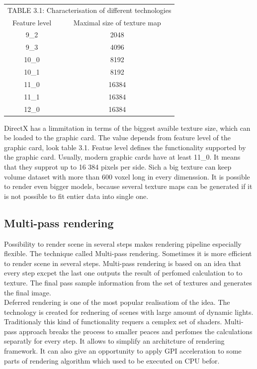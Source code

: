 \documentclass[twoside, english, 11pt]{report}
\begin{document}
\begin{table}[!h]
 \begin{center}
    \begin{tabular}{ c  c }
    \multicolumn{2}{l}{TABLE 3.1: Characterisation of different technologies \label{tab:level}}\\
    Feature level & Maximal size of texture map\\
    \hline
    9\_2 & 2048\\
    9\_3 & 4096\\
    10\_0 & 8192\\
    10\_1 & 8192\\
    11\_0 & 16384\\
    11\_1 & 16384\\
    12\_0 & 16384\\
    \end{tabular}

  \end{center}
\end{table}
DirectX has a limmitation in terms of the biggest avaible texture size, which can be loaded to the graphic card. The value depends from feature level of the graphic card, look table 3.1. Featue level defines the functionality supported by the graphic card. Usually, modern graphic cards have at least 11\_0. It means that they supprot up to 16 384 pixels per side. Sich a big texture can keep volume dataset with more than 600 voxel long in every dimenssion. It is possible to render even bigger models, because several texture maps can be generated if it is not possible to fit entier data into single one.\\

\subsection{Multi-pass rendering}

Possibility to render scene in several steps makes rendering pipeline especially flexible. The technique called Multi-pass rendering. Sometimes it is more efficient to render scene in several steps. Multi-pass rendering is based on an idea that every step excpet the last one outputs the result of perfomed calculation to to texture. The final pass sample information from the set of textures and generates the final image.\\

Deferred rendering is one of the most popular realisatiom of the idea. The technology is created for rednering of scenes with large amount of dynamic lights. Traditionaly this kind of functionality requers a cemplex set of shaders. Multi-pass approach breaks the process to smaller peaces and perfomes the calculations separatly for every step. It allows to simplify an architcture of rendering framework. It can also give an opportunity to apply GPI acceleration to some parts of rendering algorithm which used to be executed on CPU befor.\\
\end{document}
